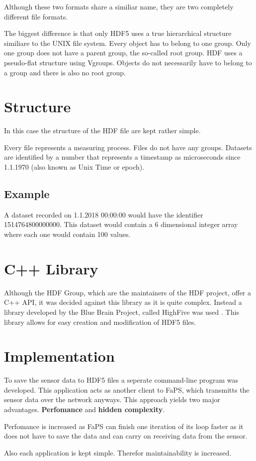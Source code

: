 Although these two formats share a similiar name, they are two completely different file formats.

The biggest difference is that only HDF5 uses a true hierarchical structure similiare to the UNIX file system. Every object has to belong to one group. Only one group does not have a parent group, the so-called root group.
HDF uses a pseudo-flat structure using Vgroups. Objects do not necessarily have to belong to a group and there is also no root group.

\section{Structure}

In this case the structure of the HDF file are kept rather simple.

Every file represents a measuring process. Files do not have any groups. Datasets are identified by a number that represents a timestamp as microseconds since 1.1.1970 (also known as Unix Time or epoch).

\subsection{Example}

A dataset recorded on 1.1.2018 00:00:00 would have the identifier 1514764800000000. This dataset would contain a 6 dimensional integer array where each one would contain 100 values.

\section {C++ Library}

Although the HDF Group, which are the maintainers of the HDF project, offer a C++ API, it was decided against this library as it is quite complex. Instead a library developed by the Blue Brain Project, called HighFive was
used \cite{HighFive}. This library allows for easy creation and modification of HDF5 files.

\section{Implementation}

To save the sensor data to HDF5 files a seperate command-line program was developed. This application acts as another client to FaPS, which transmitts the sensor data over the network anyways. This approach yields two
major advantages. \textbf{Perfomance} and \textbf{hidden complexity}.

Perfomance is increased as FaPS can finish one iteration of its loop faster as it does not have to save the data and can carry on receiving data from the sensor.

Also each application is kept simple. Therefor maintainability is increased.

